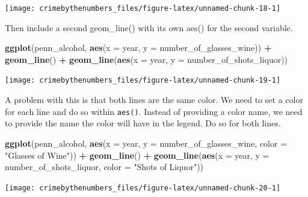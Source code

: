 \documentclass[
  12pt,
]{book}
\newenvironment{Shaded}{\begin{snugshade}}{\end{snugshade}}
\newcommand{\DataTypeTok}[1]{\textcolor[rgb]{0.27,0.27,0.27}{#1}}
\newcommand{\KeywordTok}[1]{\textcolor[rgb]{0.27,0.27,0.27}{\textbf{#1}}}
\newcommand{\NormalTok}[1]{#1}
\newcommand{\OperatorTok}[1]{\textcolor[rgb]{0.43,0.43,0.43}{\textbf{#1}}}
\newcommand{\StringTok}[1]{\textcolor[rgb]{0.5,0.5,0.5}{#1}}
\begin{document}
\begin{center}\texttt{[image: crimebythenumbers\_files/figure-latex/unnamed-chunk-18-1]} \end{center}

Then include a second geom\_line() with its own aes() for the second variable.

\begin{Shaded}
\begin{Highlighting}[]
\KeywordTok{ggplot}\NormalTok{(penn\_alcohol, }\KeywordTok{aes}\NormalTok{(}\DataTypeTok{x =}\NormalTok{ year, }\DataTypeTok{y =}\NormalTok{ number\_of\_glasses\_wine)) }\OperatorTok{+}
\StringTok{  }\KeywordTok{geom\_line}\NormalTok{() }\OperatorTok{+}
\StringTok{  }\KeywordTok{geom\_line}\NormalTok{(}\KeywordTok{aes}\NormalTok{(}\DataTypeTok{x =}\NormalTok{ year, }\DataTypeTok{y =}\NormalTok{ number\_of\_shots\_liquor))}
\end{Highlighting}
\end{Shaded}

\begin{center}\texttt{[image: crimebythenumbers\_files/figure-latex/unnamed-chunk-19-1]} \end{center}

A problem with this is that both lines are the same color. We need to set a color for each line and do so within \texttt{aes()}. Instead of providing a color name, we need to provide the name the color will have in the legend. Do so for both lines.

\begin{Shaded}
\begin{Highlighting}[]
\KeywordTok{ggplot}\NormalTok{(penn\_alcohol, }\KeywordTok{aes}\NormalTok{(}\DataTypeTok{x =}\NormalTok{ year, }\DataTypeTok{y =}\NormalTok{ number\_of\_glasses\_wine,}
                         \DataTypeTok{color =} \StringTok{"Glasses of Wine"}\NormalTok{)) }\OperatorTok{+}
\StringTok{  }\KeywordTok{geom\_line}\NormalTok{() }\OperatorTok{+}
\StringTok{  }\KeywordTok{geom\_line}\NormalTok{(}\KeywordTok{aes}\NormalTok{(}\DataTypeTok{x =}\NormalTok{ year, }\DataTypeTok{y =}\NormalTok{ number\_of\_shots\_liquor,}
                \DataTypeTok{color =} \StringTok{"Shots of Liquor"}\NormalTok{))}
\end{Highlighting}
\end{Shaded}

\begin{center}\texttt{[image: crimebythenumbers\_files/figure-latex/unnamed-chunk-20-1]} \end{center}
\end{document}

